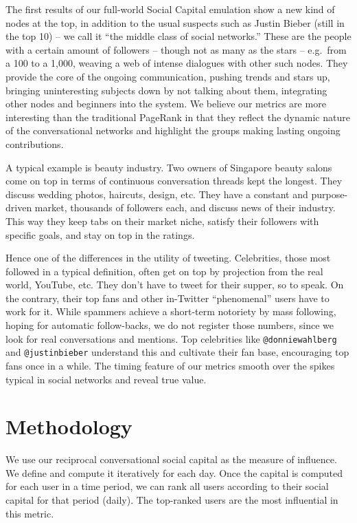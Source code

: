 \documentclass[10pt,oneside]{memoir}
\begin{document}
The first results of our full-world Social Capital emulation show a new kind of nodes at the top, in addition to the usual suspects such as Justin Bieber (still in the top 10) -- we call it ``the middle class of social networks.'' These are the people with a certain amount of followers -- though not as many as the stars -- e.g.\ from a 100 to a 1,000, weaving a web of intense dialogues with other such nodes. They provide the core of the ongoing communication, pushing trends and stars up, bringing uninteresting subjects down by not talking about them, integrating other nodes and beginners into the system. We believe our metrics are more interesting than the traditional PageRank in that they reflect the dynamic nature of the conversational networks and highlight the groups making lasting ongoing contributions.


A typical example is beauty industry. Two owners of Singapore beauty salons come on top in terms of continuous conversation threads kept the longest. They discuss wedding photos, haircuts, design, etc. They have a constant and purpose-driven market, thousands of followers each, and discuss news of their industry. This way they keep tabs on their market niche, satisfy their followers with specific goals, and stay on top in the ratings.


Hence one of the differences in the utility of tweeting. Celebrities, those most followed in a typical definition, often get on top by projection from the real world, YouTube, etc. They don't have to tweet for their supper, so to speak. On the contrary, their top fans and other in-Twitter ``phenomenal'' users have to work for it. While spammers achieve a short-term notoriety by mass following, hoping for automatic follow-backs, we do not register those numbers, since we look for real conversations and mentions. Top celebrities like \texttt{@donniewahlberg} and \texttt{@justinbieber} understand this and cultivate their fan base, encouraging top fans once in a while. The timing feature of our metrics smooth over the spikes typical in social networks and reveal true value.


\pagebreak \section{Methodology}
\label{methodology}

We use our reciprocal conversational social capital as the measure of influence.  We define and compute it iteratively for each day.  Once the capital is computed for each user in a time period,  we can rank all users according to their social capital for that period (daily).  The top-ranked users are the most influential in this metric.
\end{document}
